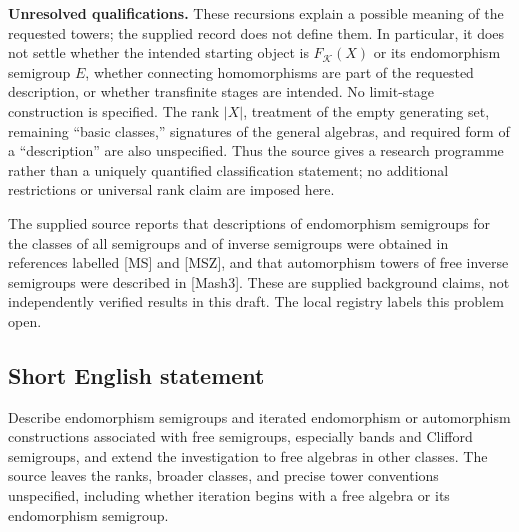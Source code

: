 \documentclass[11pt]{article}
\begin{document}
\textbf{Unresolved qualifications.} These recursions explain a possible meaning of the requested towers; the supplied record does not define them. In particular, it does not settle whether the intended starting object is \(F_{\mathcal K}(X)\) or its endomorphism semigroup \(E\), whether connecting homomorphisms are part of the requested description, or whether transfinite stages are intended. No limit-stage construction is specified. The rank \(|X|\), treatment of the empty generating set, remaining ``basic classes,'' signatures of the general algebras, and required form of a ``description'' are also unspecified. Thus the source gives a research programme rather than a uniquely quantified classification statement; no additional restrictions or universal rank claim are imposed here.

The supplied source reports that descriptions of endomorphism semigroups for the classes of all semigroups and of inverse semigroups were obtained in references labelled [MS] and [MSZ], and that automorphism towers of free inverse semigroups were described in [Mash3]. These are supplied background claims, not independently verified results in this draft. The local registry labels this problem open.
\subsection{Short English statement}
Describe endomorphism semigroups and iterated endomorphism or automorphism constructions associated with free semigroups, especially bands and Clifford semigroups, and extend the investigation to free algebras in other classes. The source leaves the ranks, broader classes, and precise tower conventions unspecified, including whether iteration begins with a free algebra or its endomorphism semigroup.
\end{document}
